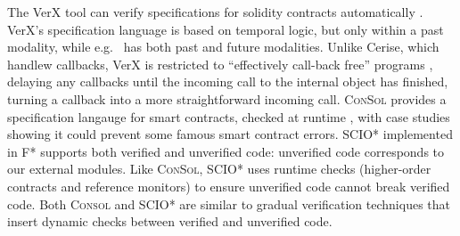 




The VerX tool can verify
specifications for solidity contracts automatically \cite{VerX}.
VerX's specification language is based on
temporal logic, 
but only within a past modality, while e.g.\ \citet{OOPSLA22} has both past
and future modalities.
%
%
%
%
%
%
Unlike Cerise, which handlew callbacks, VerX
is restricted to ``effectively call-back free'' programs
\cite{Grossman,relaxed-callbacks-ToDES},
delaying any callbacks until the
incoming call to the internal object has finished,
turning a callback
into a more straightforward  incoming call. 
%
\textsc{ConSol} \cite{consolidating-pldi2024}
provides a specification langauge for smart contracts,
checked at runtime \cite{FinFel01},  with case studies 
showing it could prevent some famous smart contract errors.
SCIO* \cite{secure-io-fstar-popl2024} implemented in
F*
supports both
verified and unverified code: unverified code 
corresponds to our external modules. 
Like \textsc{ConSol}, SCIO* uses runtime checks
(higher-order contracts and reference monitors)
to ensure unverified
code cannot break verified code.
Both \textsc{Consol} and SCIO* are 
similar to gradual verification techniques 
\cite{gradual-verification-popl2024,Cok2022} that
insert dynamic checks between verified and unverified code.



